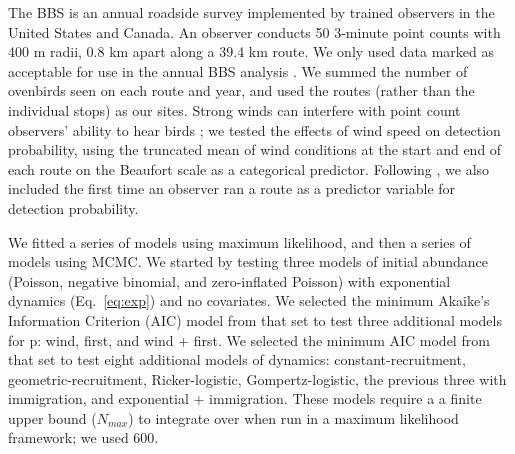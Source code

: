 \documentclass[12pt,english]{article}
\begin{document}
\begin{spacing}{1.9}
\begin{flushleft}
The BBS is an annual roadside survey implemented by trained
observers in the United States and Canada. An observer conducts 50
3-minute point counts with 400 m radii, 0.8 km apart 
along a
39.4 km route. We only used data marked as acceptable for use in the annual BBS
analysis \citep{sauer_etal:1994auk}.  We summed the number of ovenbirds
seen on each route and year, and used the routes (rather
than the individual stops) as our sites.
Strong winds can interfere with point count observers' ability
to hear birds \citep{simons_etal:2007}; we tested the effects of wind
speed on detection probability, using the truncated mean of wind conditions at the start and end of
each route on the Beaufort scale as a categorical predictor. 
Following \citet{link_sauer:2002},
we also included the first time an observer ran a route as a predictor variable for detection
probability.

We fitted a series of models using maximum likelihood, 
and then a series of models using MCMC. We started by testing
three models of initial abundance (Poisson, negative binomial, and
zero-inflated Poisson) with exponential dynamics
(Eq.~\ref{eq:exp}) and no covariates.  We selected the minimum Akaike's Information
Criterion (AIC) model from that set to test three additional
models for p: wind, first, and wind + first. We selected the minimum
AIC model from that set to test eight additional models of dynamics:
constant-recruitment, geometric-recruitment, Ricker-logistic, Gompertz-logistic, 
the previous three with immigration, and exponential + immigration.
These models require a a finite upper bound ($N_{max}$) to integrate
over when run in a maximum likelihood
framework; we used 600. %


\end{flushleft}
\end{spacing}
\end{document}
